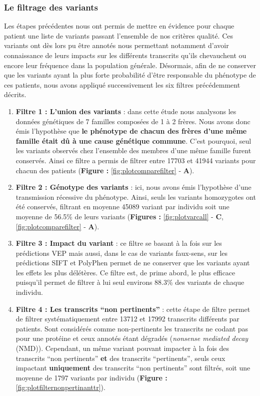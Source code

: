 \documentclass[12pt,a4paper,twoside]{ugathesis}
\theoremstyle{definition}
\theoremstyle{definition}
\theoremstyle{definition}
\theoremstyle{remark}
\begin{document}
\subsubsection{Le filtrage des
variants}\label{le-filtrage-des-variants-2}

Les étapes précédentes nous ont permis de mettre en évidence pour chaque
patient une liste de variants passant l'ensemble de nos critères
qualité. Ces variants ont dès lors pu être annotés nous permettant
notamment d'avoir connaissance de leurs impacts sur les différents
transcrits qu'ils chevauchent ou encore leur fréquence dans la
population générale. Désormais, afin de ne conserver que les variants
ayant la plus forte probabilité d'être responsable du phénotype de ces
patients, nous avons appliqué successivement les six filtres
précédemment décrits.

\begin{enumerate}
\def\labelenumi{\arabic{enumi}.}
\item
  \textbf{Filtre 1 : L'union des variants} : dans cette étude nous
  analysons les données génétiques de 7 familles composées de 1 à 2
  frères. Nous avons donc émis l'hypothèse que \textbf{le phénotype de
  chacun des frères d'une même famille était dû à une cause génétique
  commune}. C'est pourquoi, seul les variants observés chez l'ensemble
  des membres d'une même famille furent conservés. Ainsi ce filtre a
  permis de filtrer entre 17703 et 41944 variants pour chacun des
  patients (\textbf{Figure : }\ref{fig:plotcomparefilter} - \textbf{A}).
\item
  \textbf{Filtre 2 : Génotype des variants} : ici, nous avons émis
  l'hypothèse d'une transmission récessive du phénotype. Ainsi, seuls
  les variants homozygotes ont été conservés, filtrant en moyenne 45089
  variant par individu soit une moyenne de 56.5\% de leurs variants
  (\textbf{Figures : }\ref{fig:plotvarcall} - \textbf{C},
  \ref{fig:plotcomparefilter} - \textbf{A}).
\item
  \textbf{Filtre 3 : Impact du variant} : ce filtre se basant à la fois
  sur les prédictions VEP mais aussi, dans le cas de variants faux-sens,
  sur les prédictions SIFT et PolyPhen permet de ne conserver que les
  variants ayant les effets les plus délétères. Ce filtre est, de prime
  abord, le plus efficace puisqu'il permet de filtrer à lui seul
  environs 88.3\% des variants de chaque individu.
\item
  \textbf{Filtre 4 : Les transcrits ``non pertinents''} : cette étape de
  filtre permet de filtrer systématiquement entre 13712 et 17992
  transcrits différents par patients. Sont considérés comme
  non-pertinents les transcrits ne codant pas pour une protéine et ceux
  annotés étant dégradés (\emph{nonsense mediated decay} (NMD)).
  Cependant, un même variant pouvant impacter à la fois des transcrits
  ``non pertinents'' \textbf{et} des transcrits ``pertinents'', seuls
  ceux impactant \textbf{uniquement} des transcrits ``non pertinents''
  sont filtrés, soit une moyenne de 1797 variants par individu
  (\textbf{Figure : }\ref{fig:plotfilternonpertinanttr}).
\end{enumerate}
\end{document}
